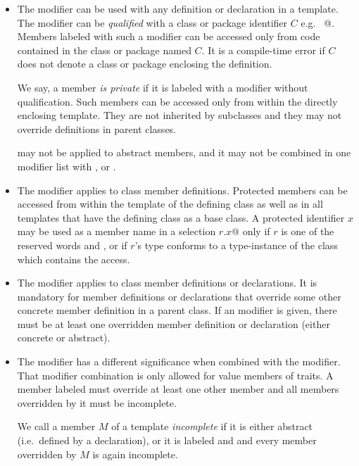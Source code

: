 \begin{itemize}
\item
The  modifier can be used with any definition or
declaration in a template.  The modifier can be {\em qualified} with a
class or package identifier $C$ e.g.  ~\lstinline@private[$C$]@.
Members labeled with such a modifier can be accessed only from code
contained in the class or package named $C$.  It is a compile-time
error if $C$ does not denote a class or package enclosing the
definition.  

We say, a member {\em is private} if it is labeled with a
 modifier without qualification.  Such members can be
accessed only from within the directly enclosing template.  They are
not inherited by subclasses and they may not override definitions in
parent classes.

 may not be applied to abstract members, and it
may not be combined in one modifier list with
,  or .
\item
The  modifier applies to class member definitions.
Protected members can be accessed from within the template of the defining
class as well as in all templates that have the defining class as a base class.
A protected identifier $x$ may be used as
a member name in a selection \lstinline@$r$.$x$@ only if $r$ is one of the reserved
words  and
, or if $r$'s type conforms to a type-instance of the class
which contains the access.
\item
The  modifier applies to class member definitions or declarations.  It
is mandatory for member definitions or declarations that override some other concrete
member definition in a parent class. If an 
modifier is given, there must be at least one overridden member
definition or declaration (either concrete or abstract).  
\item
The  modifier has a different significance when
combined with the  modifier.  That modifier combination
is only allowed for value members of traits.  A member labeled
 must override at least one other member and 
all members overridden by it must be incomplete. 

We call a member $M$ of a template {\em incomplete} if it is either
abstract (i.e.\ defined by a declaration), or it is labeled
 and  and 
every member overridden by $M$ is again incomplete. 


\end{itemize}
